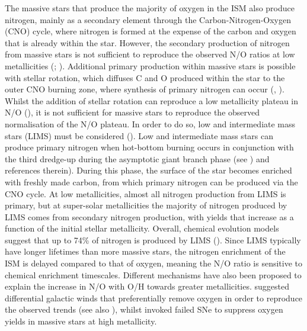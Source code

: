 \documentclass[usenatbib]{mnras} %
\begin{document}
The massive stars that produce the majority of oxygen in the ISM also produce nitrogen, mainly as a secondary element through the Carbon-Nitrogen-Oxygen (CNO) cycle, where nitrogen is formed at the expense of the carbon and oxygen that is already within the star. However, the secondary production of nitrogen from massive stars is not sufficient to reproduce the observed N/O ratios at low metallicities (\citealt{Matteucci_1986}; \citealt{Chiappini_2005}). Additional primary production within massive stars is possible with stellar rotation, which diffuses C and O produced within the star to the outer CNO burning zone, where synthesis of primary nitrogen can occur (\citealt{Chiappini_2006}, \citeyear{Chiappini_2008}). Whilst the addition of stellar rotation can reproduce a low metallicity plateau in N/O (\citealt{Kobayashi_2011}), it is not sufficient for massive stars to reproduce the observed normalisation of the N/O plateau. In order to do so, low and intermediate mass stars (LIMS) must be considered (\citealt{V_K_2018}). Low and intermediate mass stars can produce primary nitrogen when hot-bottom burning occurs in conjunction with the third dredge-up during the asymptotic giant branch phase (see \citealt{Vincenzo_2016}) and references therein). During this phase, the surface of the star becomes enriched with freshly made carbon, from which primary nitrogen can be produced via the CNO cycle. At low metallicities, almost all nitrogen production from LIMS is primary, but at super-solar metallicities the majority of nitrogen produced by LIMS comes from secondary nitrogen production, with yields that increase as a function of the initial stellar metallicity. Overall, chemical evolution models suggest that up to 74\% of nitrogen is produced by LIMS (\citealt{Kobayashi_2020}). Since LIMS typically have longer lifetimes than more massive stars, the nitrogen enrichment of the ISM is delayed compared to that of oxygen, meaning the N/O ratio is sensitive to chemical enrichment timescales. Different mechanisms have also been proposed to explain the increase in N/O with O/H towards greater metallicities. \cite{Vincenzo_2016} suggested differential galactic winds that preferentially remove oxygen in order to reproduce the observed trends (see also \citealt{Magrini_2018}), whilst \cite{V_K_2018a} invoked failed SNe to suppress oxygen yields in massive stars at high metallicity. 
\end{document}
